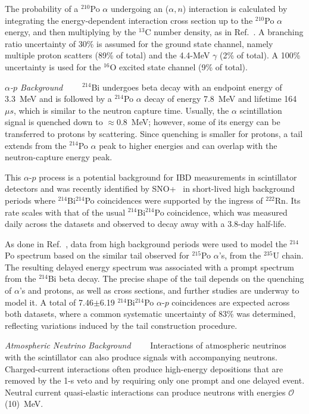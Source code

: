 \documentclass[%
 reprint,
superscriptaddress,
 amsmath,amssymb,
 aps,
]{revtex4-2}
\newcommand{\alphan}{($\alpha, n$) }
\newcommand{\alphap}{$\alpha$-$p$ }
\begin{document}
The probability of a $^{210}$Po $\alpha$ undergoing an \alphan interaction is calculated by integrating the energy-dependent interaction cross section up to the $^{210}$Po $\alpha$ energy, and then multiplying by the $^{13}$C number density, as in Ref.~\cite{snoplus_partial_antinu}. A branching ratio uncertainty of 30\% is assumed for the ground state channel, namely multiple proton scatters (89\% of total) and the 4.4-MeV $\gamma$ (2\% of total).  A 100\% uncertainty is used for the $^{16}$O excited state channel (9\% of total).  

\smallskip
\textit{\alphap Background}~~\textemdash~~
$^{214}$Bi undergoes beta decay with an endpoint energy of 3.3~MeV and is followed by a $^{214}$Po $\alpha$ decay of energy 7.8~MeV and lifetime 164~$\mu s$, which is similar to the neutron capture time. 
Usually, the $\alpha$ scintillation signal is quenched down to $\approx$0.8~MeV; however, 
some of its energy can be transferred to protons by scattering. Since quenching is smaller for protons, a tail extends from the $^{214}$Po $\alpha$ peak to higher energies and can overlap with the neutron-capture energy peak. 

This \alphap process is a potential background for IBD measurements in scintillator detectors and was recently identified by SNO+~\cite{sno+ppo} in short-lived high background periods where $^{214}$Bi$^{214}$Po coincidences were supported by the ingress of $^{222}$Rn. Its rate scales with that of the usual $^{214}$Bi$^{214}$Po coincidence, which was measured daily across the datasets and observed to decay away with a 3.8-day half-life.  

As done in Ref.~\cite{sno+ppo}, data from high background periods were used to model the $^{214}$Po spectrum based on the similar tail observed for $^{215}$Po $\alpha$'s, from the $^{235}$U chain. The resulting delayed energy spectrum was associated with a prompt spectrum from the $^{214}$Bi beta decay.  The precise shape of the tail depends on the quenching of $\alpha$'s and protons, as well as cross sections, and further studies are underway to model it. 
A total of 7.46$\pm$6.19 $^{214}$Bi$^{214}$Po \alphap coincidences are expected across both datasets, where a common systematic uncertainty of 83\% was determined, reflecting variations induced by the tail construction procedure. 

\smallskip
\textit{Atmospheric Neutrino Background}~~\textemdash~~
Interactions of atmospheric neutrinos with the scintillator can also produce signals with accompanying neutrons. Charged-current interactions often produce high-energy depositions that are removed by the 1-s veto and by requiring only one prompt and one delayed event. Neutral current quasi-elastic interactions can produce neutrons with energies $\mathcal{O}$(10)~MeV. 
\end{document}
